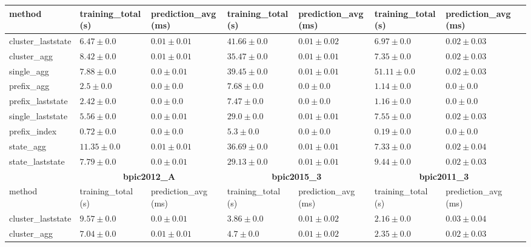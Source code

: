 \documentclass[twoside,11pt]{Latex/Classes/PhDthesisPSnPDF}
\begin{document}
\begin{table}[!htbp]
{\begin{tabular}{llllllll}
			method  & training\_total (s) & prediction\_avg (ms) & training\_total (s) & prediction\_avg (ms) & training\_total (s) & prediction\_avg (ms) \\ \midrule
			cluster\_laststate & $6.47 \pm 0.0$ & $0.01 \pm 0.01$ & $41.66 \pm 0.0$ & $0.01 \pm 0.02$ & $6.97 \pm 0.0$ & $0.02 \pm 0.03$ \\ 
			cluster\_agg & $8.42 \pm 0.0$ & $0.01 \pm 0.01$ & $35.47 \pm 0.0$ & $0.01 \pm 0.01$ & $7.35 \pm 0.0$ & $0.02 \pm 0.03$ \\ 
			single\_agg & $7.88 \pm 0.0$ & $\mathbf{0.0 \pm 0.01}$ & $39.45 \pm 0.0$ & $0.01 \pm 0.01$ & $51.11 \pm 0.0$ & $0.02 \pm 0.03$ \\ 
			prefix\_agg & $2.5 \pm 0.0$ & $\mathbf{0.0 \pm 0.0}$ & $7.68 \pm 0.0$ & $\mathbf{0.0 \pm 0.0}$ & $1.14 \pm 0.0$ & $\mathbf{0.0 \pm 0.0}$ \\ 
			prefix\_laststate & $2.42 \pm 0.0$ & $\mathbf{0.0 \pm 0.0}$ & $7.47 \pm 0.0$ & $\mathbf{0.0 \pm 0.0}$ & $1.16 \pm 0.0$ & $\mathbf{0.0 \pm 0.0}$ \\ 
			single\_laststate & $5.56 \pm 0.0$ & $\mathbf{0.0 \pm 0.01}$ & $29.0 \pm 0.0$ & $0.01 \pm 0.01$ & $7.55 \pm 0.0$ & $0.02 \pm 0.03$ \\ 
			prefix\_index & $\mathbf{0.72 \pm 0.0}$ & $\mathbf{0.0 \pm 0.0}$ & $\mathbf{5.3 \pm 0.0}$ & $\mathbf{0.0 \pm 0.0}$ & $\mathbf{0.19 \pm 0.0}$ & $\mathbf{0.0 \pm 0.0}$ \\ 
			state\_agg & $11.35 \pm 0.0$ & $0.01 \pm 0.01$ & $36.69 \pm 0.0$ & $0.01 \pm 0.01$ & $7.33 \pm 0.0$ & $0.02 \pm 0.04$ \\ 
			state\_laststate & $7.79 \pm 0.0$ & $\mathbf{0.0 \pm 0.01}$ & $29.13 \pm 0.0$ & $0.01 \pm 0.01$ & $9.44 \pm 0.0$ & $0.02 \pm 0.03$ \\ 
			\bottomrule
			\toprule
			& \multicolumn{2}{c}{{\bfseries bpic2012\_A}} & \multicolumn{2}{c}{{\bfseries bpic2015\_3}} & \multicolumn{2}{c}{{\bfseries bpic2011\_3}} \\ \cmidrule(lr){2-3} \cmidrule(lr){4-5} \cmidrule(lr){6-7}
			method  & training\_total (s) & prediction\_avg (ms) & training\_total (s) & prediction\_avg (ms) & training\_total (s) & prediction\_avg (ms) \\ \midrule
			cluster\_laststate & $9.57 \pm 0.0$ & $\mathbf{0.0 \pm 0.01}$ & $3.86 \pm 0.0$ & $0.01 \pm 0.02$ & $2.16 \pm 0.0$ & $0.03 \pm 0.04$ \\ 
			cluster\_agg & $7.04 \pm 0.0$ & $0.01 \pm 0.01$ & $4.7 \pm 0.0$ & $0.01 \pm 0.02$ & $2.35 \pm 0.0$ & $0.02 \pm 0.03$ \\ 

\end{tabular}}
\end{table}
\end{document}
